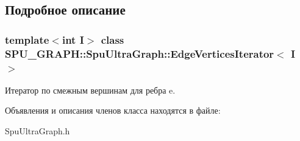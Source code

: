 \subsection{Подробное описание}
\subsubsection*{template$<$int I$>$\newline
class S\+P\+U\+\_\+\+G\+R\+A\+P\+H\+::\+Spu\+Ultra\+Graph\+::\+Edge\+Vertices\+Iterator$<$ I $>$}

Итератор по смежным вершинам для ребра e. 

Объявления и описания членов класса находятся в файле\+:\begin{DoxyCompactItemize}
\item 
Spu\+Ultra\+Graph.\+h\end{DoxyCompactItemize}
